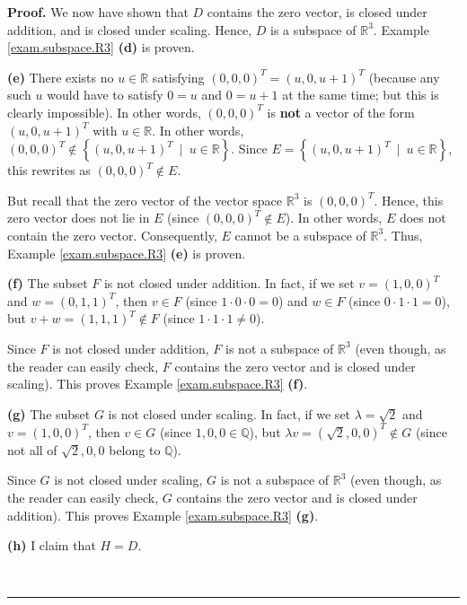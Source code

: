 \documentclass[numbers=enddot,12pt,final,onecolumn,notitlepage]{scrartcl}%
\theoremstyle{definition}
\newenvironment{proof}[1][Proof]{\noindent\textbf{#1.} }{\ \rule{0.5em}{0.5em}}
\begin{document}
\begin{proof}
We now have shown that $D$ contains the zero vector, is closed under addition,
and is closed under scaling. Hence, $D$ is a subspace of $\mathbb{R}^{3}$.
Example \ref{exam.subspace.R3} \textbf{(d)} is proven.

\textbf{(e)} There exists no $u\in\mathbb{R}$ satisfying $\left(
0,0,0\right)  ^{T}=\left(  u,0,u+1\right)  ^{T}$ (because any such $u$ would
have to satisfy $0=u$ and $0=u+1$ at the same time; but this is clearly
impossible). In other words, $\left(  0,0,0\right)  ^{T}$ is \textbf{not} a
vector of the form $\left(  u,0,u+1\right)  ^{T}$ with $u\in\mathbb{R}$. In
other words, $\left(  0,0,0\right)  ^{T}\notin\left\{  \left(  u,0,u+1\right)
^{T}\ \mid\ u\in\mathbb{R}\right\}  $. Since $E=\left\{  \left(
u,0,u+1\right)  ^{T}\ \mid\ u\in\mathbb{R}\right\}  $, this rewrites as
$\left(  0,0,0\right)  ^{T}\notin E$.

But recall that the zero vector of the vector space $\mathbb{R}^{3}$ is
$\left(  0,0,0\right)  ^{T}$. Hence, this zero vector does not lie in $E$
(since $\left(  0,0,0\right)  ^{T}\notin E$). In other words, $E$ does not
contain the zero vector. Consequently, $E$ cannot be a subspace of
$\mathbb{R}^{3}$. Thus, Example \ref{exam.subspace.R3} \textbf{(e)} is proven.

\textbf{(f)} The subset $F$ is not closed under addition. In fact, if we set
$v=\left(  1,0,0\right)  ^{T}$ and $w=\left(  0,1,1\right)  ^{T}$, then $v\in
F$ (since $1\cdot0\cdot0=0$) and $w\in F$ (since $0\cdot1\cdot1=0$), but
$v+w=\left(  1,1,1\right)  ^{T}\notin F$ (since $1\cdot1\cdot1\neq0$).

Since $F$ is not closed under addition, $F$ is not a subspace of
$\mathbb{R}^{3}$ (even though, as the reader can easily check, $F$ contains
the zero vector and is closed under scaling). This proves Example
\ref{exam.subspace.R3} \textbf{(f)}.

\textbf{(g)} The subset $G$ is not closed under scaling. In fact, if we set
$\lambda=\sqrt{2}$ and $v=\left(  1,0,0\right)  ^{T}$, then $v\in G$ (since
$1,0,0\in\mathbb{Q}$), but $\lambda v=\left(  \sqrt{2},0,0\right)  ^{T}\notin
G$ (since not all of $\sqrt{2},0,0$ belong to $\mathbb{Q}$).

Since $G$ is not closed under scaling, $G$ is not a subspace of $\mathbb{R}%
^{3}$ (even though, as the reader can easily check, $G$ contains the zero
vector and is closed under addition). This proves Example
\ref{exam.subspace.R3} \textbf{(g)}.

\textbf{(h)} I claim that $H=D$.


\end{proof}
\end{document}
